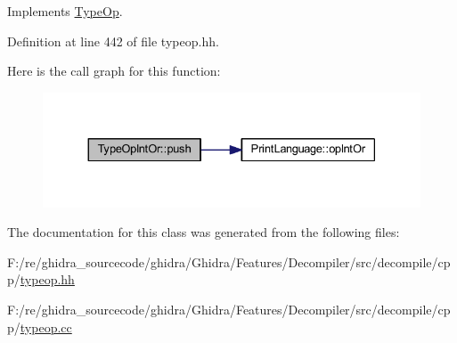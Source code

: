Implements \mbox{\hyperlink{class_type_op_ac9c9544203ed74dabe6ac662b653b2af}{Type\+Op}}.



Definition at line 442 of file typeop.\+hh.

Here is the call graph for this function\+:
\nopagebreak
\begin{figure}[H]
\begin{center}
\leavevmode
\includegraphics[width=330pt]{class_type_op_int_or_ade4437d6b019dad4cddbf857453e4c5b_cgraph}
\end{center}
\end{figure}


The documentation for this class was generated from the following files\+:\begin{DoxyCompactItemize}
\item 
F\+:/re/ghidra\+\_\+sourcecode/ghidra/\+Ghidra/\+Features/\+Decompiler/src/decompile/cpp/\mbox{\hyperlink{typeop_8hh}{typeop.\+hh}}\item 
F\+:/re/ghidra\+\_\+sourcecode/ghidra/\+Ghidra/\+Features/\+Decompiler/src/decompile/cpp/\mbox{\hyperlink{typeop_8cc}{typeop.\+cc}}\end{DoxyCompactItemize}
